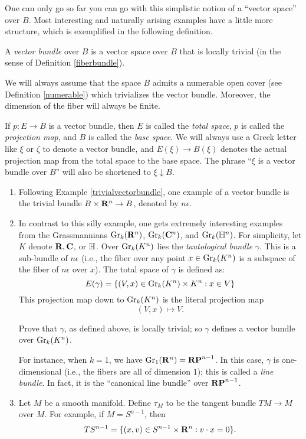 One can only go so far you can go with this simplistic notion of a ``vector
space'' over $B$. Most interesting and naturally arising examples have a little
more structure, which is exemplified in the following definition.
\begin{definition}
    A \emph{vector bundle} over $B$ is a vector space over $B$ that is locally
    trivial (in the sense of Definition \ref{fiberbundle}).
\end{definition}
\begin{remark}
    We will always assume that the space $B$ admits a numerable open cover (see
    Definition \ref{numerable}) which trivializes the vector bundle. Moreover,
    the dimension of the fiber will always be finite.
\end{remark}
If $p:E\to B$ is a vector bundle, then $E$ is called the \emph{total space},
$p$ is called the \emph{projection map}, and $B$ is called the \emph{base
space}. We will always use a Greek letter like $\xi$ or $\zeta$ to denote a
vector bundle, and $E(\xi)\to B(\xi)$ denotes the actual projection map from
the total space to the base space. The phrase ``$\xi$ is a vector bundle over
$B$'' will also be shortened to $\xi\downarrow B$.
\begin{example}\label{grassmannianvb}
\begin{enumerate}
    \item Following Example \ref{trivialvectorbundle}, one example of a vector
	bundle is the trivial bundle $B\times\mathbf R^n\to B$, denoted by
	$n\epsilon$.
    \item In contrast to this silly example, one gets extremely interesting
	examples from the Grassmannians $\mathrm{Gr}_k(\mathbf R^n)$, $\mathrm{Gr}_k(\mathbf C^n)$, and
	$\mathrm{Gr}_k(\mathbb H^n)$. For simplicity, let $K$ denote $\mathbf R,\mathbf C$, or $\mathbb H$.
	Over $\mathrm{Gr}_k(K^n)$ lies the \emph{tautological bundle} $\gamma$. This
	is a sub-bundle of $n\epsilon$ (i.e., the fiber over any point $x\in
	\mathrm{Gr}_k(K^n)$ is a subspace of the fiber of $n\epsilon$ over $x$). The
	total space of $\gamma$ is defined as:
	\begin{equation*}
	    E(\gamma) = \{(V,x)\in\mathrm{Gr}_k(K^n)\times K^n:x\in V\}
	\end{equation*}
	This projection map down to $\mathrm{Gr}_k(K^n)$ is the literal projection map
	$$(V,x)\mapsto V.$$
	\begin{exercise}
	    Prove that $\gamma$, as defined above, is locally trivial; so
	    $\gamma$ defines a vector bundle over $\mathrm{Gr}_k(K^n)$.
	\end{exercise}
	    For instance, when $k=1$, we have $\mathrm{Gr}_1(\mathbf R^n) = \mathbf{RP}^{n-1}$. In
	    this case, $\gamma$ is one-dimensional (i.e., the fibers are all of
	    dimension $1$); this is called a \emph{line bundle}. In fact, it is
	    the ``canonical line bundle'' over $\mathbf{RP}^{n-1}$.
    \item Let $M$ be a smooth manifold. Define $\tau_M$ to be the tangent
	bundle $TM\to M$ over $M$. For example, if $M = S^{n-1}$, then
	$$TS^{n-1} = \{(x,v)\in S^{n-1}\times\mathbf R^n:v\cdot x = 0\}.$$
\end{enumerate}
\end{example}
